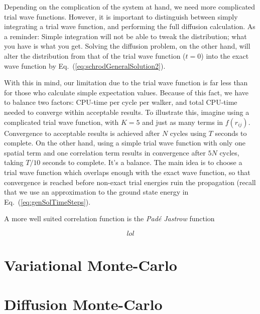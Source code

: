 Depending on the complication of the system at hand, we need more complicated trial wave functions. However, it is important to distinguish between simply integrating a trial wave function, and performing the full diffusion calculation. As a reminder: Simple integration will not be able to tweak the distribution; what you have is what you get. Solving the diffusion problem, on the other hand, will alter the distribution from that of the trial wave function ($t = 0$) into the exact wave function by Eq.~(\ref{eq:schrodGeneralSolution2}). 

With this in mind, our limitation due to the trial wave function is far less than for those who calculate simple expectation values. 
Because of this fact, we have to balance two factors: CPU-time per cycle per walker, and total CPU-time needed to converge within acceptable results. 
To illustrate this, imagine using a complicated trial wave function, with $K=5$ and just as many terms in $f(r_{ij})$. 
Convergence to acceptable results is achieved after $N$ cycles using $T$ seconds to complete. 
On the other hand, using a simple trial wave function with only one spatial term and one correlation term results in convergence after $5N$ cycles, 
taking $T/10$ seconds to complete. It's a balance. 
The main idea is to choose a trial wave function which overlaps enough with the exact wave function, so that convergence is reached before non-exact trial energies ruin the propagation (recall that we use an approximation to the ground state energy in Eq.~(\ref{eq:genSolTimeSteps}).

A more well suited correlation function is the \textit{Padé Jastrow} function

\begin{equation}
lol 
\end{equation}


\section{Variational Monte-Carlo}
\label{sec:VMC}



\section{Diffusion Monte-Carlo}
\label{sec:DMC}





